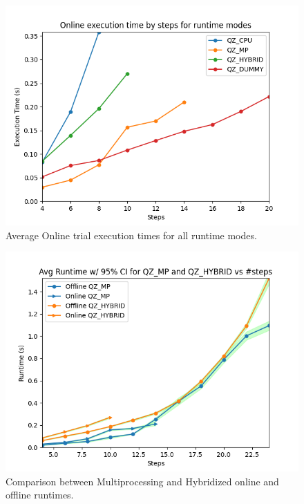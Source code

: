 \documentclass[runningheads]{llncs}
\begin{document}
\begin{figure}[H]
\includegraphics[width=\textwidth]{profiler_out/online_avg_unified.png}
\caption{Average Online trial execution times for all runtime modes.} \label{online_avg}
\end{figure}
\begin{figure}[H]
\includegraphics[width=\textwidth]{profiler_out/avg_mp_hybrid_CI.png}
\caption{Comparison between Multiprocessing and Hybridized online and offline runtimes.} \label{mp_hybrid_ci}
\end{figure}
\end{document}
